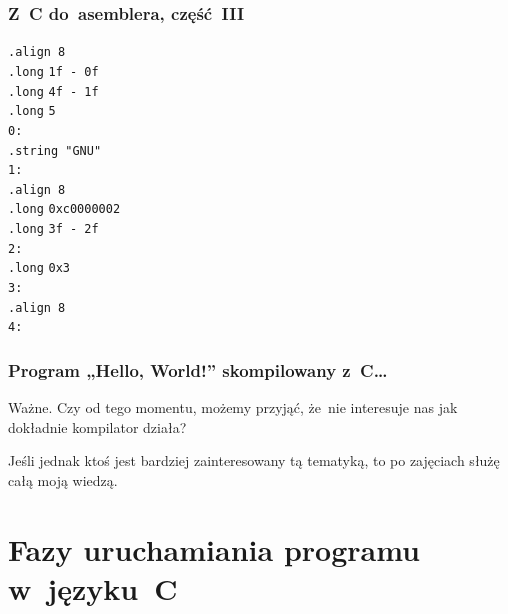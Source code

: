 \documentclass[10pt,t]{beamer}
\begin{document}
\begin{frame}
  \frametitle{Z~C do~asemblera, część~III}


  \hphantom{aaaaa} \texttt{.align 8} \\
  \hphantom{aaaaa} \texttt{.long} \hphantom{aaa} \texttt{1f - 0f} \\
  \hphantom{aaaaa} \texttt{.long} \hphantom{aaa} \texttt{4f - 1f} \\
  \hphantom{aaaaa} \texttt{.long} \hphantom{aaa} \texttt{5} \\
  \texttt{0:} \\
  \hphantom{aaaaa} \texttt{.string "GNU"} \\
  \texttt{1:} \\
  \hphantom{aaaaa} \texttt{.align 8} \\
  \hphantom{aaaaa} \texttt{.long} \hphantom{aaa} \texttt{0xc0000002} \\
  \hphantom{aaaaa} \texttt{.long} \hphantom{aaa} \texttt{3f - 2f} \\
  \texttt{2:} \\
  \hphantom{aaaaa} \texttt{.long} \hphantom{aaa} \texttt{0x3} \\
  \texttt{3:} \\
  \hphantom{aaaaa} \texttt{.align 8} \\
  \texttt{4:}

\end{frame}





\begin{frame}
  \frametitle{Program „Hello, World!” skompilowany z~C\ldots}


  \alert{Ważne.} Czy od tego momentu, możemy przyjąć, że~nie interesuje
  nas jak dokładnie kompilator działa?

  Jeśli jednak ktoś jest bardziej zainteresowany tą tematyką, to po
  zajęciach służę całą moją wiedzą.

\end{frame}










\section{Fazy uruchamiania programu w~języku~C}
\end{document}
